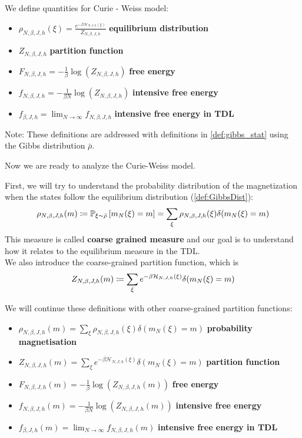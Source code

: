 \begin{definition}
\label{def:CWqt}
We define quantities for Curie - Weiss model:
    \begin{itemize}
        \item $\rho_{N,\beta,J,h}(\xi) =\frac{ e^{-\beta \mathcal{H}_{N,J,h}(\xi)}}{Z_{N,\beta,J,h}} $ \quad \textbf{equilibrium distribution}
        \item $Z_{N,\beta,J,h} $ \quad \textbf{partition function}
        \item $F_{N,\beta,J,h} = -\frac{1}{\beta } \log(Z_{N,\beta,J,h}) $ \quad \textbf{free energy}
        \item $f_{N,\beta,J,h} = -\frac{1}{\beta N} \log(Z_{N,\beta,J,h}) $ \quad \textbf{intensive free energy}
        \item $f_{\beta,J,h} = \lim_{N \to \infty} f_{N,\beta,J,h}$ \quad \textbf{intensive free energy in TDL}
    \end{itemize}

	\bigskip\noindent Note: These definitions are addressed with definitions in \cref{def:gibbs_stat} using the Gibbs distribution $\bar{\rho}$.
\end{definition}
Now we are ready to analyze the Curie-Weiss model.

\noindent First, we will try to understand the probability distribution of the magnetization when the states follow the equilibrium distribution (\cref{def:GibbsDist}):
\[
\rho_{N,\beta,J,h}(m) \coloneqq \mathbb{P}_{\xi\sim\bar{\rho}}\left[m_N(\xi) = m\right] = \sum_{\xi}  \rho_{N,\beta,J,h}(\xi) \delta(m_N(\xi) = m )
\]
This measure is called \textbf{coarse grained measure} and our goal is to understand how it relates to the equilibrium measure in the TDL.\\
We also introduce the coarse-grained partition function, which is
\[
Z_{N,\beta,J,h}(m) \coloneqq \sum_{\xi} e^{-\beta \mathcal{H}_{N,J,h}(\xi)} \delta(m_N(\xi) = m )
\]
\begin{definition} We will continue these definitions with other coarse-grained partition functions:
    \begin{itemize}
        \item $\rho_{N,\beta,J,h}(m) = \sum_{\xi}  \rho_{N,\beta,J,h}(\xi) \delta(m_N(\xi) = m ) $ \quad \textbf{probability magnetisation}
        \item $Z_{N,\beta,J,h}(m) = \sum_{\xi} e^{-\beta \mathcal{H}_{N,J,h}(\xi)}  \delta(m_N(\xi) = m ) $ \quad \textbf{partition function}
        \item $F_{N,\beta,J,h}(m) = -\frac{1}{\beta } \log(Z_{N,\beta,J,h}(m)) $ \quad \textbf{free energy}
        \item $f_{N,\beta,J,h}(m) = -\frac{1}{\beta N} \log(Z_{N,\beta,J,h}(m)) $ \quad \textbf{intensive free energy}
        \item $f_{\beta,J,h}(m) = \lim_{N \to \infty} f_{N,\beta,J,h}(m)$ \quad \textbf{intensive free energy in TDL}
\end{itemize}
\end{definition}

